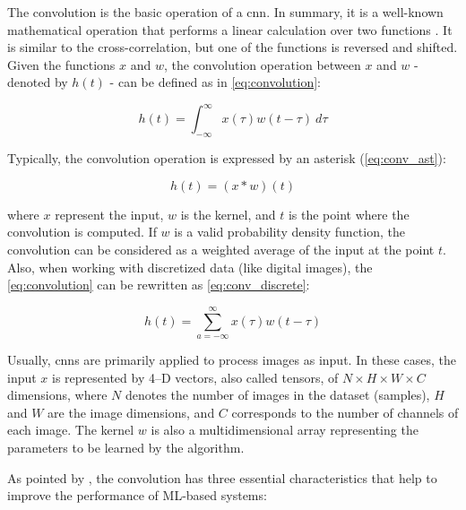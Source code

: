 The convolution is the basic operation of a \acs{cnn}. In summary, it is a well-known mathematical operation that performs a linear calculation over two functions \citep{goodfellow2016deep}. It is similar to the cross-correlation, but one of the functions is reversed and shifted. Given the functions $x$ and $w$, the convolution operation between $x$ and $w$ - denoted by $h(t)$ - can be defined as in \autoref{eq:convolution}:

\begin{equation}
\label{eq:convolution}
h(t) = \int_{-\infty }^{\infty} x(\tau)w(t - \tau)\ d\tau
\end{equation}

\noindent
Typically, the convolution operation is expressed by an asterisk (\autoref{eq:conv_ast}):

\begin{equation}
\label{eq:conv_ast}
h(t) = (x * w)(t)
\end{equation}

\noindent
where $x$ represent the input, $w$ is the kernel, and $t$ is the point where the convolution is computed. If $w$ is a valid probability density function, the convolution can be considered as a weighted average of the input at the point $t$. Also, when working with discretized data (like digital images), the \autoref{eq:convolution} can be rewritten as \autoref{eq:conv_discrete}:

\begin{equation}
\label{eq:conv_discrete}
h(t) = \sum_{a=-\infty}^{\infty} x(\tau)w(t - \tau)
\end{equation}

Usually, \acsp{cnn} are primarily applied to process images as input. In these cases, the input $x$ is represented by 4--D vectors, also called tensors, of $N \times H \times W \times C$ dimensions, where $N$ denotes the number of images in the dataset (samples), $H$ and $W$ are the image dimensions, and $C$ corresponds to the number of channels of each image. The kernel $w$ is also a multidimensional array representing the parameters to be learned by the algorithm.

As pointed by \cite{goodfellow2016deep}, the convolution has three essential characteristics that help to improve the performance of ML-based systems:

